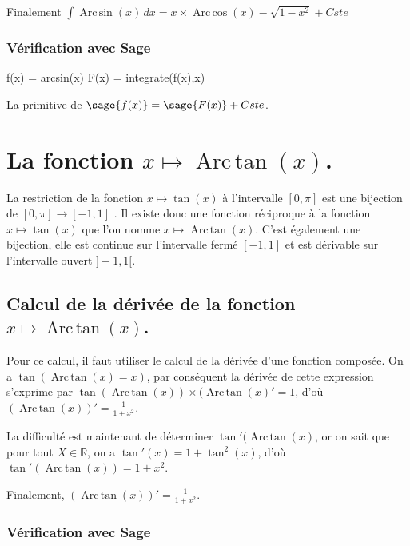 \documentclass[a4paper,14pt]{extreport} %
\def\eclaire{\mathbb}
\def\R{\ensuremath{\eclaire R}}
\renewcommand{\arcsin}{\mathop{\mathrm{Arc\,sin}}}
\renewcommand{\arccos}{\mathop{\mathrm{Arc\,cos}}}
\renewcommand{\arctan}{\mathop{\mathrm{Arc\,tan}}}
\begin{document}
Finalement $\int \arcsin(x) \, dx = x \times \arccos(x) - \sqrt{1- x^2} + Cste $

\subsubsection{Vérification avec Sage}

\begin{sageblock}
    f(x) = arcsin(x)
    F(x) = integrate(f(x),x)
\end{sageblock}

La primitive de $\sage{f(x)} = \sage{F(x)} + Cste $.




\section{La fonction  $x \mapsto \arctan(x) $.}




La restriction de la fonction $x \mapsto \tan(x) $ à l'intervalle $[0,\pi]$ est une bijection de $[0,\pi] \rightarrow [-1,1]$ . Il existe donc une fonction réciproque à la fonction $x \mapsto \tan(x) $ que l'on nomme $x \mapsto \arctan(x) $. C'est également une bijection, elle est continue sur l'intervalle fermé  $ [-1,1]$ et est dérivable sur l'intervalle ouvert $]-1,1[$.



\subsection{Calcul de la dérivée de la fonction $x \mapsto \arctan(x) $.}




Pour ce calcul, il faut utiliser le calcul de la dérivée d'une fonction composée. On a $\tan(\arctan(x)=x)$, par conséquent la dérivée de cette expression s'exprime par $ \tan(\arctan(x)) \times (\arctan(x)' = 1$, d'où $(\arctan(x))' = \frac{1}{1+x^2} $.

La difficulté est maintenant de déterminer $\tan'(\arctan(x)$, or on sait que pour tout $X \in \R$, on a $ \tan'(x) =1+\tan^2(x) $, d'où $\tan'(\arctan(x)) = 1+x^2$.

Finalement, $(\arctan(x))' = \frac{1}{1+x^2}$.

\subsubsection*{Vérification avec Sage}
\end{document}
